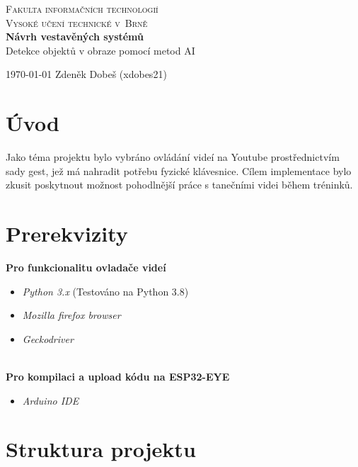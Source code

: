 \documentclass[titlepage, a4paper, 11pt]{article}
\begin{document}
\begin{titlepage}
    \begin{center}
            \Huge
            \textsc{Fakulta informačních technologií}\\
            \textsc{Vysoké učení technické v~Brně}\\
        \LARGE
        \textbf{Návrh vestavěných systémů}\\
        Detekce objektů v obraze pomocí metod AI\\
    \end{center}
    {\Large \today \hfill
Zdeněk Dobeš (xdobes21)}
\end{titlepage}

\tableofcontents
\clearpage

\setcounter{page}{1}

\section{Úvod}
Jako téma projektu bylo vybráno ovládání videí na Youtube prostřednictvím sady gest, jež má nahradit potřebu fyzické klávesnice. Cílem implementace bylo zkusit poskytnout  možnost pohodlnější práce s tanečními videi během tréninků.    

\section{Prerekvizity} 
\textbf{Pro funkcionalitu ovladače videí}
\begin{itemize}
    \item \textit{Python 3.x} (Testováno na Python 3.8)
    \item \textit{Mozilla firefox browser}
    \item \textit{Geckodriver}
\end{itemize}
\\
\textbf{Pro kompilaci a upload kódu na ESP32-EYE}
\begin{itemize}
    \item \textit{Arduino IDE}
\end{itemize}

\section{Struktura projektu}
\end{document}
